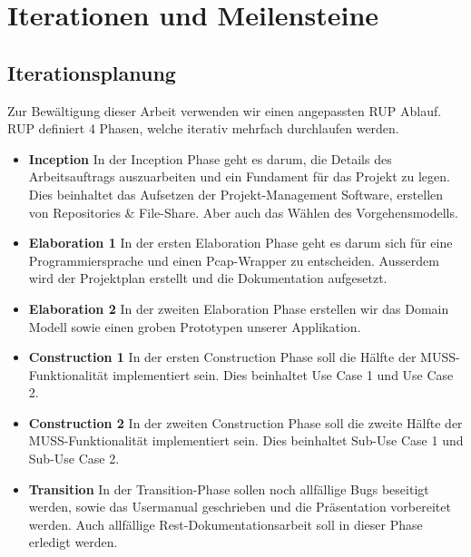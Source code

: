 \section{Iterationen und Meilensteine}
\label{sec:Iterationen und Meilensteine}

\subsection{Iterationsplanung}
Zur Bewältigung dieser Arbeit verwenden wir einen angepassten \acl{RUP} Ablauf. \acs{RUP} definiert 4 Phasen, welche iterativ mehrfach durchlaufen werden.

\begin{itemize}
  \item \textbf{Inception} \newline In der Inception Phase geht es darum, die Details des Arbeitsauftrags auszuarbeiten und ein Fundament für das Projekt zu legen. Dies beinhaltet das Aufsetzen der Projekt-Management Software, erstellen von Repositories \& File-Share. Aber auch das Wählen des Vorgehensmodells.
  \item \textbf{Elaboration 1} \newline In der ersten Elaboration Phase geht es darum sich für eine Programmiersprache und einen Pcap-Wrapper zu entscheiden. Ausserdem wird der Projektplan erstellt und die Dokumentation aufgesetzt.
  \item \textbf{Elaboration 2} \newline In der zweiten Elaboration Phase erstellen wir das Domain Modell sowie einen groben Prototypen unserer Applikation.
  \item \textbf{Construction 1} \newline In der ersten Construction Phase soll die Hälfte der MUSS-Funktionalität implementiert sein. Dies beinhaltet Use Case 1 und Use Case 2.
  \item \textbf{Construction 2} \newline In der zweiten Construction Phase soll die zweite Hälfte der MUSS-Funktionalität implementiert sein. Dies beinhaltet Sub-Use Case 1 und Sub-Use Case 2.
  \item \textbf{Transition} \newline In der Transition-Phase sollen noch allfällige Bugs beseitigt werden, sowie das Usermanual geschrieben und die Präsentation vorbereitet werden. Auch allfällige Rest-Dokumentationsarbeit soll in dieser Phase erledigt werden.
\end{itemize}

